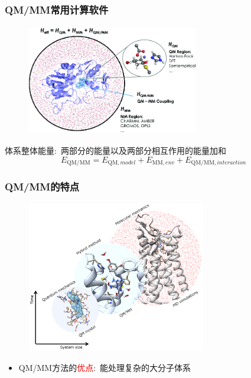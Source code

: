 \frame
{
	\frametitle{\textrm{QM/MM}常用计算软件}
\begin{figure}[h!]
\centering
\vspace{-10.5pt}
\includegraphics[height=1.90in,width=2.95in,viewport=0 0 700 450,clip]{Figures/QM-MM-treatment-of-a-biocatalytic-system.png}
\label{QM-MM-biocatalytic}
\end{figure}
体系整体能量:~两部分的能量以及两部分相互作用的能量加和
\begin{displaymath}
	E_{\mathrm{QM/MM}}=E_{\mathrm{QM},model}+E_{\mathrm{MM},env}+E_{\mathrm{QM/MM},interaction}
\end{displaymath}
{\fontsize{6.0pt}{4.2pt}}
}

\frame
{
	\frametitle{\textrm{QM/MM}的特点}
\begin{figure}[h!]
\centering
\vspace{-10.5pt}
\includegraphics[height=2.60in,width=3.10in,viewport=0 0 280 250,clip]{Figures/biomolecules-QM-MM.png}
\label{biomelecules-QM-MM}
\end{figure}
\begin{itemize}
	\item \textrm{QM/MM}方法的\textcolor{red}{优点}:~能处理复杂的大分子体系\\{\fontsize{6.0pt}{4.2pt}}
\end{itemize}
}

